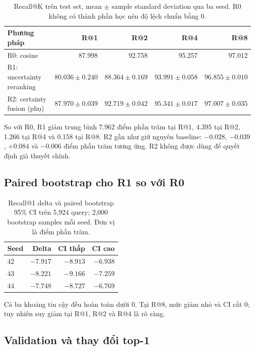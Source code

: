 \documentclass[11pt,a4paper]{article}
\begin{document}
\begin{table}[h]
\centering
\caption{Recall@K trên test set, mean $\pm$ sample standard deviation
qua ba seed. R0 không có thành phần học nên độ lệch chuẩn bằng 0.}
\begin{tabular}{lrrrr}
\toprule
Phương pháp & R@1 & R@2 & R@4 & R@8 \\
\midrule
R0: cosine
& 87.998 & 92.758 & 95.257 & 97.012 \\
R1: uncertainty reranking
& $80.036\pm0.240$ & $88.364\pm0.169$
& $93.991\pm0.058$ & $96.855\pm0.010$ \\
R2: certainty fusion (phụ)
& $87.970\pm0.039$ & $92.719\pm0.042$
& $95.341\pm0.017$ & $97.007\pm0.035$ \\
\bottomrule
\end{tabular}
\end{table}

So với R0, R1 giảm trung bình 7.962 điểm phần trăm tại R@1, 4.395 tại
R@2, 1.266 tại R@4 và 0.158 tại R@8. R2 gần như giữ nguyên baseline:
$-0.028$, $-0.039$, $+0.084$ và $-0.006$ điểm phần trăm tương ứng.
R2 không được dùng để quyết định giả thuyết chính.

\subsection{Paired bootstrap cho R1 so với R0}

\begin{table}[h]
\centering
\caption{Recall@1 delta và paired bootstrap 95\% CI trên 5,924 query;
2,000 bootstrap samples mỗi seed. Đơn vị là điểm phần trăm.}
\begin{tabular}{lrrr}
\toprule
Seed & Delta & CI thấp & CI cao \\
\midrule
42 & $-7.917$ & $-8.913$ & $-6.938$ \\
43 & $-8.221$ & $-9.166$ & $-7.259$ \\
44 & $-7.748$ & $-8.727$ & $-6.769$ \\
\bottomrule
\end{tabular}
\end{table}

Cả ba khoảng tin cậy đều hoàn toàn dưới 0. Tại R@8, mức giảm nhỏ và CI
cắt 0; tuy nhiên suy giảm tại R@1, R@2 và R@4 là rõ ràng.

\subsection{Validation và thay đổi top-1}
\end{document}
